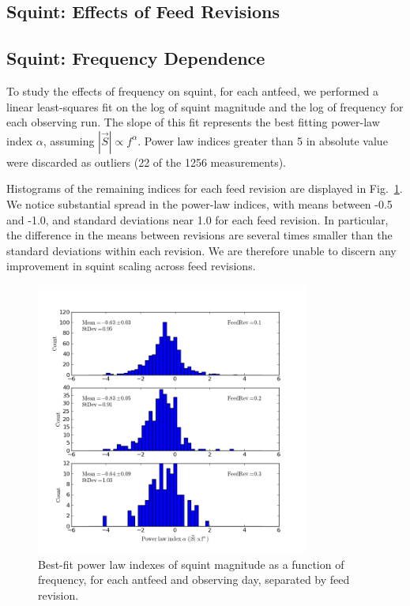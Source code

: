 \documentclass[preprint]{aastex}
\begin{document}
\subsection{Squint: Effects of Feed Revisions}\label{ss.revisions}

\subsection{Squint: Frequency Dependence}\label{ss.freq}
To study the effects of frequency on squint, for each antfeed, we
performed a linear least-squares fit on the log of squint magnitude
and the log of frequency for each observing run.  The slope of this
fit represents the best fitting power-law index $\alpha$, assuming
$|\vec{S}| \propto f^\alpha$.  Power law indices greater than 5 in absolute 
value were discarded as outliers (22 of the 1256 measurements).

Histograms of the remaining indices for each feed revision are displayed in 
Fig.~\ref{fig.powerlaws}.  We notice substantial spread in the power-law 
indices, with means between -0.5 and -1.0, and standard deviations near 
1.0 for each feed revision.  In particular, the difference in the means 
between revisions are several times smaller than the standard deviations 
within each revision. We are therefore unable to discern any improvement in 
squint scaling across feed revisions.

\begin{figure}[htb]
\begin{center}
\includegraphics[width=0.8\textwidth]{images/powerlaw_rev}
\caption{Best-fit power law indexes of squint magnitude as a function of frequency, for each antfeed and observing day, separated by feed revision. \label{fig.powerlaws}}
\end{center}
\end{figure}
\end{document}
